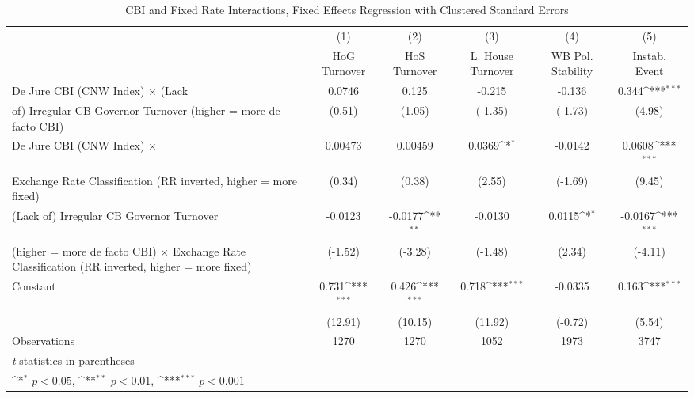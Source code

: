 \begin{table}[htbp]\centering
\def\sym#1{\ifmmode^{#1}\else\(^{#1}\)\fi}
\caption{CBI and Fixed Rate Interactions, Fixed Effects Regression with Clustered Standard Errors \label{imultIndFE}}
\begin{tabular}{l*{5}{c}}
\toprule
                                        &\multicolumn{1}{c}{(1)}&\multicolumn{1}{c}{(2)}&\multicolumn{1}{c}{(3)}&\multicolumn{1}{c}{(4)}&\multicolumn{1}{c}{(5)}\\
                                        &\multicolumn{1}{c}{HoG Turnover}&\multicolumn{1}{c}{HoS Turnover}&\multicolumn{1}{c}{L. House Turnover}&\multicolumn{1}{c}{WB Pol. Stability}&\multicolumn{1}{c}{Instab. Event}\\
\midrule
De Jure CBI (CNW Index) $\times$ (Lack  &   0.0746         &    0.125         &   -0.215         &   -0.136         &    0.344\sym{***}\\
of) Irregular CB Governor Turnover (higher = more de facto CBI)&   (0.51)         &   (1.05)         &  (-1.35)         &  (-1.73)         &   (4.98)         \\
\addlinespace
De Jure CBI (CNW Index) $\times$        &  0.00473         &  0.00459         &   0.0369\sym{*}  &  -0.0142         &   0.0608\sym{***}\\
Exchange Rate Classification (RR inverted, higher = more fixed)&   (0.34)         &   (0.38)         &   (2.55)         &  (-1.69)         &   (9.45)         \\
\addlinespace
(Lack of) Irregular CB Governor Turnover&  -0.0123         &  -0.0177\sym{**} &  -0.0130         &   0.0115\sym{*}  &  -0.0167\sym{***}\\
(higher = more de facto CBI) $\times$ Exchange Rate Classification (RR inverted, higher = more fixed)&  (-1.52)         &  (-3.28)         &  (-1.48)         &   (2.34)         &  (-4.11)         \\
\addlinespace
Constant                                &    0.731\sym{***}&    0.426\sym{***}&    0.718\sym{***}&  -0.0335         &    0.163\sym{***}\\
                                        &  (12.91)         &  (10.15)         &  (11.92)         &  (-0.72)         &   (5.54)         \\
\midrule
Observations                            &     1270         &     1270         &     1052         &     1973         &     3747         \\
\bottomrule
\multicolumn{6}{l}{\footnotesize \textit{t} statistics in parentheses}\\
\multicolumn{6}{l}{\footnotesize \sym{*} \(p<0.05\), \sym{**} \(p<0.01\), \sym{***} \(p<0.001\)}\\
\end{tabular}
\end{table}
